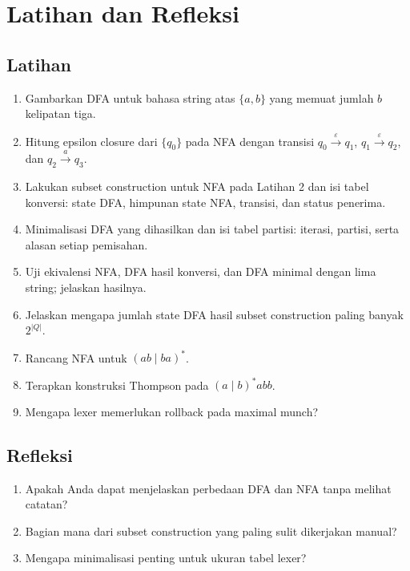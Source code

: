 \section*{Latihan dan Refleksi}

\subsection*{Latihan}
\begin{enumerate}[label=\arabic*.,leftmargin=*]
  \item Gambarkan DFA untuk bahasa string atas \(\{a,b\}\) yang
        memuat jumlah \(b\) kelipatan tiga.
  \item Hitung epsilon closure dari \(\{q_0\}\) pada NFA dengan
        transisi \(q_0 \xrightarrow{\varepsilon} q_1\),
        \(q_1 \xrightarrow{\varepsilon} q_2\), dan
        \(q_2 \xrightarrow{a} q_3\).
  \item Lakukan subset construction untuk NFA pada Latihan 2 dan isi
        tabel konversi: state DFA, himpunan state NFA, transisi, dan
        status penerima.
  \item Minimalisasi DFA yang dihasilkan dan isi tabel partisi:
        iterasi, partisi, serta alasan setiap pemisahan.
  \item Uji ekivalensi NFA, DFA hasil konversi, dan DFA minimal dengan
        lima string; jelaskan hasilnya.
  \item Jelaskan mengapa jumlah state DFA hasil subset construction
        paling banyak \(2^{|Q|}\).
  \item Rancang NFA untuk \((ab \mid ba)^{*}\).
  \item Terapkan konstruksi Thompson pada \((a \mid b)^{*}abb\).
  \item Mengapa lexer memerlukan rollback pada maximal munch?
\end{enumerate}

\subsection*{Refleksi}
\begin{reflectionbox}
\begin{enumerate}[label=\arabic*.,leftmargin=*]
  \item Apakah Anda dapat menjelaskan perbedaan DFA dan NFA tanpa
        melihat catatan?
  \item Bagian mana dari subset construction yang paling sulit
        dikerjakan manual?
  \item Mengapa minimalisasi penting untuk ukuran tabel lexer?
\end{enumerate}
\end{reflectionbox}
